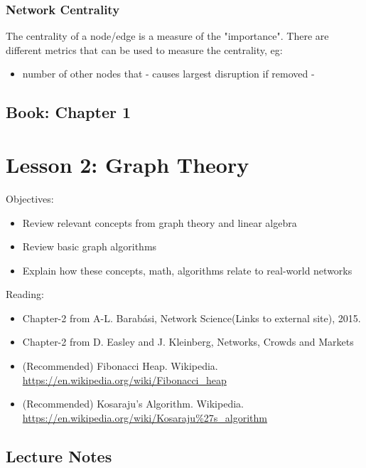\documentclass[11pt]{scrartcl} %
\begin{document}
\subsubsection{Network Centrality}
The centrality of a node/edge is a measure of the "importance". There are different metrics that can be used to measure the centrality, eg:
\begin{itemize}
	\item number of other nodes that 
- causes largest disruption if removed
-
\end{itemize}


\subsection{Book: Chapter 1}



\section{Lesson 2: Graph Theory}

Objectives:
\begin{itemize}
	\item Review relevant concepts from graph theory and linear algebra
	\item Review basic graph algorithms 
	\item Explain how these concepts, math, algorithms relate to real-world networks
\end{itemize}

Reading:
\begin{itemize}
	\item Chapter-2 from A-L. Barabási, Network Science(Links to external site), 2015.
	\item Chapter-2 from D. Easley and J. Kleinberg, Networks, Crowds and Markets
	\item (Recommended) Fibonacci Heap. Wikipedia. \url{https://en.wikipedia.org/wiki/Fibonacci\_heap}
	\item (Recommended) Kosaraju's Algorithm. Wikipedia. \url{https://en.wikipedia.org/wiki/Kosaraju\%27s\_algorithm}
\end{itemize}

\subsection{Lecture Notes}
\end{document}
